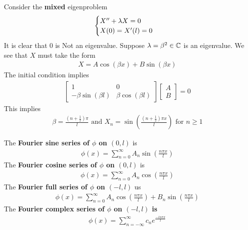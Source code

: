 \documentclass{report}
\begin{document}
\begin{mdframed}
Consider the \textbf{mixed} eigenproblem 
\begin{align*}
\begin{cases}
  X''+ \lambda  X=0 \\
  X(0)=X'(l)=0
\end{cases}
\end{align*}
It is clear that $0$ is Not an eigenvalue. Suppose $\lambda = \beta ^2\in\mathbb{C}$ is an eigenvalue. We see that $X$ must take the form 
 \begin{align*}
X=A \cos (\beta x)+ B \sin (\beta x)
\end{align*}
The initial condition implies 
\begin{align*}
\begin{bmatrix}
  1 & 0 \\
  -\beta  \sin (\beta l) & \beta \cos (\beta l) 
\end{bmatrix} \begin{bmatrix}
A \\
B
\end{bmatrix}=0 
\end{align*}
This implies
\begin{align*}
\beta = \frac{(n+ \frac{1}{2})\pi }{l}\text{ and }X_n= \sin (\frac{(n+ \frac{1}{2})\pi  x}{l})\text{ for }n\geq 1
\end{align*}
\end{mdframed}
\begin{mdframed}
The \textbf{Fourier sine series of $\phi$ on $(0,l)$} is 
  \begin{align*}
  \phi (x)=\sum_{n=0}^{\infty} A_n \sin (\frac{n \pi  x}{l})
  \end{align*}
The \textbf{Fourier cosine series of $\phi$ on $(0,l)$} is 
  \begin{align*}
  \phi (x)=\sum_{n=0}^{\infty} A_n \cos (\frac{n \pi  x}{l})
  \end{align*}
The \textbf{Fourier full series of $\phi$ on $(-l,l)$} us 
\begin{align*}
\phi (x)= \sum_{n=0}^{\infty} A_n \cos (\frac{n \pi  x}{l})+ B_n \sin ( \frac{n \pi  x}{l})
\end{align*}
The \textbf{Fourier complex series of $\phi$ on $(-l,l)$ is}
\begin{align*}
\phi (x)=\sum_{n=-\infty}^{\infty}  c_n e^{\frac{- i n \pi  x}{l}}
\end{align*}
\end{mdframed}
\end{document}
